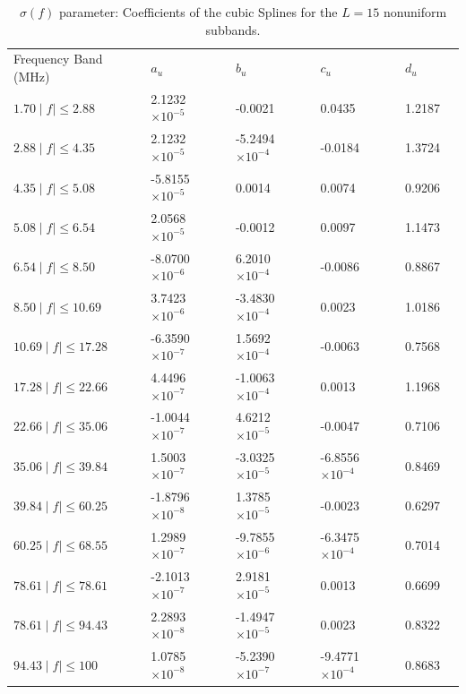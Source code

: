 \documentclass[journal]{IEEEtran}
\begin{document}
\begin{table}[h]
	\setlength\extrarowheight{4.5pt}
	\centering
	\vspace*{-5mm}
	\caption{$\sigma(f)$ parameter: Coefficients of the cubic Splines for the $L=15$ nonuniform subbands.}
	\label{table_betasW}
	\begin{tabular}{|C{3.5cm}|C{2.5cm}|C{2.5cm}|C{2.5cm}|C{2.5cm}|m{0cm}}
		Frequency Band (MHz)           		   & $a_u$    			   	   & $b_u$      			  & $c_u$   		 		 & $d_u$ &\\ 
		$1.70 \mid f\mid \leq 2.88$   & 2.1232 $\times 10^{-5}$   & -0.0021 				  & 0.0435	 				 & 1.2187 &\\ 
		$2.88 \mid f\mid \leq 4.35$   & 2.1232 $\times 10^{-5}$   & -5.2494 $\times 10^{-4}$ & -0.0184  				 & 1.3724 &\\ 
		$4.35 \mid f\mid \leq 5.08$   & -5.8155 $\times 10^{-5}$  & 0.0014 				  & 0.0074 					 & 0.9206 &\\ 
		$5.08 \mid f\mid \leq 6.54$   & 2.0568 $\times 10^{-5}$   & -0.0012 				  & 0.0097	 				 & 1.1473 &\\ 
		$6.54 \mid f\mid \leq 8.50$   & -8.0700 $\times 10^{-6}$  & 6.2010 $\times 10^{-4}$  & -0.0086 				 & 0.8867 &\\ 
		$8.50 \mid f\mid \leq 10.69$  & 3.7423 $\times 10^{-6}$   & -3.4830 $\times 10^{-4}$ & 0.0023	 				 & 1.0186 &\\ 
		$10.69 \mid f\mid \leq 17.28$ & -6.3590 $\times 10^{-7}$  & 1.5692 $\times 10^{-4}$  & -0.0063  				 & 0.7568 &\\ 
		$17.28 \mid f\mid \leq 22.66$ & 4.4496 $\times 10^{-7}$   & -1.0063 $\times 10^{-4}$ & 0.0013 					 & 1.1968 &\\ 
		$22.66 \mid f\mid \leq 35.06$ & -1.0044  $\times 10^{-7}$ & 4.6212 $\times 10^{-5}$  & -0.0047					 & 0.7106 &\\ 
		$35.06 \mid f\mid \leq 39.84$ & 1.5003  $\times 10^{-7}$  & -3.0325 $\times 10^{-5}$ & -6.8556 $\times 10^{-4}$ & 0.8469 &\\ 
		$39.84 \mid f\mid \leq 60.25$ & -1.8796 $\times 10^{-8}$  & 1.3785  $\times 10^{-5}$ & -0.0023  				 & 0.6297 &\\ 
		$60.25 \mid f\mid \leq 68.55$ & 1.2989   $\times 10^{-7}$ & -9.7855 $\times 10^{-6}$ & -6.3475	$\times 10^{-4}$ & 0.7014 &\\ 
		$78.61 \mid f\mid \leq 78.61$ & -2.1013 $\times 10^{-7}$  & 2.9181  $\times 10^{-5}$ & 0.0013					 & 0.6699 &\\ 
		$78.61 \mid f\mid \leq 94.43$ & 2.2893  $\times 10^{-8}$  & -1.4947 $\times 10^{-5}$ & 0.0023				     & 0.8322 &\\ 
		$94.43 \mid f\mid \leq 100$   & 1.0785  $\times 10^{-8}$  & -5.2390 $\times 10^{-7}$ & -9.4771 $\times 10^{-4}$ & 0.8683 &\\ 
	\end{tabular}
\end{table}
\end{document}
